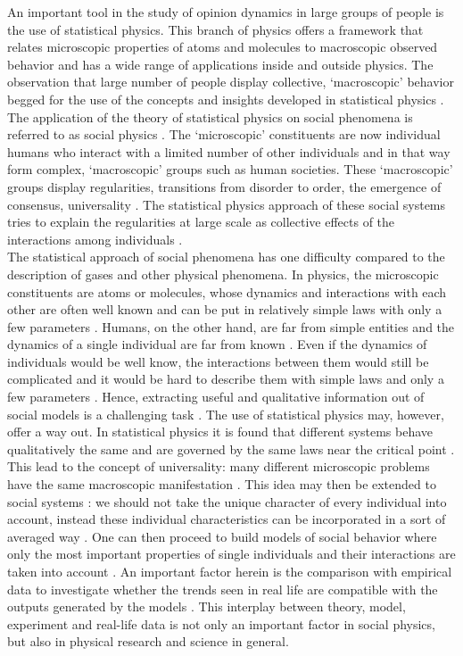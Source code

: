 \documentclass[11 pt , letterpaper , twoside , openright]{book}
\begin{document}
An important tool in the study of opinion dynamics in large groups of people is the use of statistical physics. This branch of physics offers a framework that relates microscopic properties of atoms and molecules to macroscopic observed behavior and has a wide range of applications inside and outside physics. The observation that large number of people display collective, `macroscopic' behavior begged for the use of the concepts and insights developed in statistical physics \cite{Sirbu2016}. The application of the theory of statistical physics on social phenomena is referred to as social physics \cite{Castellano2009}\cite{Galam2008}\cite{Galam1982}\cite{Stauffer2012}. The `microscopic' constituents are now individual humans who interact with a limited number of other individuals and in that way form complex, `macroscopic' groups such as human societies. These `macroscopic' groups display regularities, transitions from disorder to order, the emergence of consensus, universality \cite{Buchanan2007}. The statistical physics approach of these social systems tries to explain the regularities at large scale as collective effects of the interactions among individuals \cite{Sirbu2016}.\\
\newline
The statistical approach of social phenomena has one difficulty compared to the description of gases and other physical phenomena. In physics, the microscopic constituents are atoms or molecules, whose dynamics and interactions with each other are often well known and can be put in relatively simple laws with only a few parameters \cite{Castellano2009}. Humans, on the other hand, are far from simple entities and the dynamics of a single individual are far from known \cite{Castellano2009}. Even if the dynamics of individuals would be well know, the interactions between them would still be complicated and it would be hard to describe them with simple laws and only a few parameters \cite{Castellano2009}. Hence, extracting useful and qualitative information out of social models is a challenging task \cite{Castellano2009}. The use of statistical physics may, however, offer a way out. In statistical physics it is found that different systems behave qualitatively the same and are governed by the same laws near the critical point \cite{Hu2018}\cite{Kadanoff2010}. This lead to the concept of universality: many different microscopic problems have the same macroscopic manifestation \cite{Gug2015}\cite{Kadanoff2015}. This idea may then be extended to social systems \cite{Hu2018}: we should not take the unique character of every individual into account, instead these individual characteristics can be incorporated in a sort of averaged way \cite{Gug2015}. One can then proceed to build models of social behavior where only the most important properties of single individuals and their interactions are taken into account \cite{Castellano2009}. An important factor herein is the comparison with empirical data to investigate whether the trends seen in real life are compatible with the outputs generated by the models \cite{Castellano2009}\cite{Pawel}. This interplay between theory, model, experiment and real-life data is not only an important factor in social physics, but also in physical research and science in general.
\end{document}
